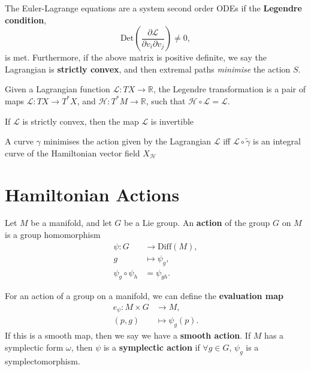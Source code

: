 \documentclass[11pt, final]{article}
\begin{document}
\begin{prop}
	The Euler-Lagrange equations are a system second order ODEs if the \textbf{Legendre condition},
		\begin{equation}
			\mathrm{Det}\left(\frac{\partial \mathcal{L}}{\partial v_i \partial v_j} \right) \neq 0,
		\end{equation}
	is met. Furthermore, if the above matrix is positive definite, we say the Lagrangian is \textbf{strictly convex}, and then extremal paths \textit{minimise} the action $S$.
\end{prop}
\begin{definition}
	Given a Lagrangian function $\mathcal{L}: TX \to \mathbb{R}$, the Legendre transformation is a pair of maps $\mathscr{L}: TX \to T^*X$, and $\mathcal{H}: T^*M \to \mathbb{R}$, such that $\mathcal{H} \circ \mathscr{L} = \mathcal{L}$.
\end{definition}
\begin{remark}
	If $\mathcal{L}$ is strictly convex, then the map $\mathscr{L}$ is invertible
\end{remark}
\begin{prop}
	A curve $\gamma$ minimises the action given by the Lagrangian $\mathcal{L}$ iff $\mathscr{L}\circ \tilde{\gamma}$ is an integral curve of the Hamiltonian vector field $X_{\mathcal{H}}$
\end{prop}

\section{Hamiltonian Actions}

\begin{definition}
	Let $M$ be a manifold, and let $G$ be a Lie group. An \textbf{action} of the group $G$ on $M$ is a group homomorphism
		\begin{align*}
			\psi:	 G &\to \mathrm{Diff}(M), \\ 
					 g &\mapsto \psi_g, \\
					 \psi_g \circ \psi_h &= \psi_{gh}.
		\end{align*}
\end{definition}

\begin{definition}
	For an action of a group on a manifold, we can define the \textbf{evaluation map}
		\begin{align*}
			e_\psi : M \times G &\to M,\\
					(p,g)	&\mapsto \psi_g(p).
		\end{align*}
	If this is a smooth map, then we say we have a \textbf{smooth action}. If $M$ has a symplectic form $\omega$, then $\psi$ is a \textbf{symplectic action} if $\forall g \in G$, $\psi_g$ is a symplectomorphism.
\end{definition}
\end{document}
